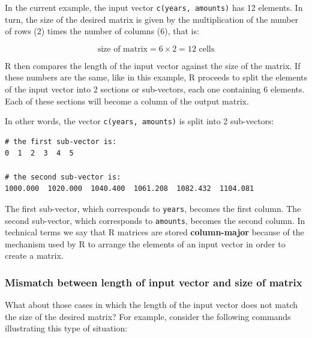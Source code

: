 \documentclass[
]{book}
\begin{document}
In the current example, the input vector \texttt{c(years,\ amounts)} has 12 elements.
In turn, the size of the desired matrix is given by the multiplication of the
number of rows (2) times the number of columns (6), that is:

\[
\text{size of matrix} = 6 \times 2 = 12 \text{ cells}
\]

R then compares the length of the input vector against the size of the matrix.
If these numbers are the same, like in this example, R proceeds to split the
elements of the input vector into 2 sections or sub-vectors, each one
containing 6 elements. Each of these sections will become a column of the
output matrix.

In other words, the vector \texttt{c(years,\ amounts)} is split into 2 sub-vectors:

\begin{verbatim}
# the first sub-vector is:
0  1  2  3  4  5

# the second sub-vector is:
1000.000  1020.000  1040.400  1061.208  1082.432  1104.081
\end{verbatim}

The first sub-vector, which corresponds to \texttt{years}, becomes the first column.
The second sub-vector, which corresponds to \texttt{amounts}, becomes the second
column. In technical terms we say that R matrices are stored
\textbf{column-major} because of the mechanism used by R to arrange the elements of
an input vector in order to create a matrix.

\hypertarget{mismatch-between-length-of-input-vector-and-size-of-matrix}{%
\subsubsection*{Mismatch between length of input vector and size of matrix}\label{mismatch-between-length-of-input-vector-and-size-of-matrix}}

What about those cases in which the length of the input vector does not match
the size of the desired matrix? For example, consider the following commands
illustrating this type of situation:
\end{document}
